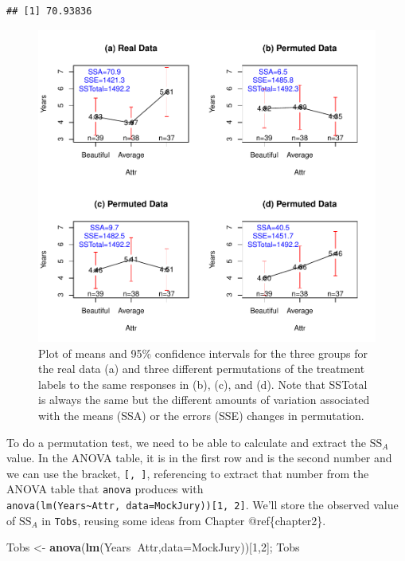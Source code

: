 \documentclass[]{book}
\newenvironment{Shaded}{\begin{snugshade}}{\end{snugshade}}
\newcommand{\KeywordTok}[1]{\textcolor[rgb]{0.13,0.29,0.53}{\textbf{#1}}}
\newcommand{\DataTypeTok}[1]{\textcolor[rgb]{0.13,0.29,0.53}{#1}}
\newcommand{\DecValTok}[1]{\textcolor[rgb]{0.00,0.00,0.81}{#1}}
\newcommand{\StringTok}[1]{\textcolor[rgb]{0.31,0.60,0.02}{#1}}
\newcommand{\OperatorTok}[1]{\textcolor[rgb]{0.81,0.36,0.00}{\textbf{#1}}}
\newcommand{\NormalTok}[1]{#1}
\theoremstyle{definition}
\theoremstyle{definition}
\theoremstyle{remark}
\begin{document}
\begin{verbatim}
## [1] 70.93836
\end{verbatim}

\begin{figure}
\centering
\includegraphics{03-oneWayAnova_files/figure-latex/Figure3-4-1.pdf}
\caption{\label{fig:Figure3-4}Plot of means and 95\% confidence intervals for the three
groups for the real data (a) and three different permutations of the
treatment labels to the same responses in (b), (c), and (d). Note that
SSTotal is always the same but the different amounts of variation
associated with the means (SSA) or the errors (SSE) changes in
permutation.}
\end{figure}

To do a permutation test, we need to be able to calculate and extract
the \(\text{SS}_A\) value. In the ANOVA table, it is in the first row
and is the second number and we can use the bracket, \texttt{{[},\ {]}},
referencing to extract that number from the ANOVA table that
\texttt{anova} produces with
\texttt{anova(lm(Years\textasciitilde{}Attr,\ data=MockJury)){[}1,\ 2{]}}.
We'll store the observed value of \(\text{SS}_A\) in \texttt{Tobs},
reusing some ideas from Chapter @ref\{chapter2\}.

\begin{Shaded}
\begin{Highlighting}[]
\NormalTok{Tobs <-}\StringTok{ }\KeywordTok{anova}\NormalTok{(}\KeywordTok{lm}\NormalTok{(Years}\OperatorTok{~}\NormalTok{Attr,}\DataTypeTok{data=}\NormalTok{MockJury))[}\DecValTok{1}\NormalTok{,}\DecValTok{2}\NormalTok{]; Tobs}
\end{Highlighting}
\end{Shaded}
\end{document}

